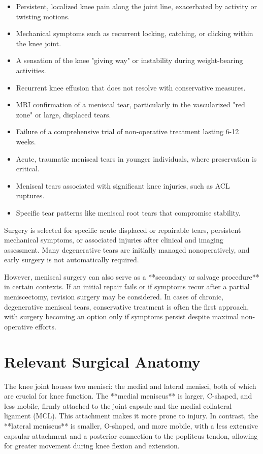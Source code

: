 \begin{itemize}
  \item Persistent, localized knee pain along the joint line, exacerbated by activity or twisting motions.
  \item Mechanical symptoms such as recurrent locking, catching, or clicking within the knee joint.
  \item A sensation of the knee "giving way" or instability during weight-bearing activities.
  \item Recurrent knee effusion that does not resolve with conservative measures.
  \item MRI confirmation of a meniscal tear, particularly in the vascularized "red zone" or large, displaced tears.
  \item Failure of a comprehensive trial of non-operative treatment lasting 6-12 weeks.
  \item Acute, traumatic meniscal tears in younger individuals, where preservation is critical.
  \item Meniscal tears associated with significant knee injuries, such as ACL ruptures.
  \item Specific tear patterns like meniscal root tears that compromise stability.
\end{itemize}

Surgery is selected for specific acute displaced or repairable tears, persistent mechanical symptoms, or associated injuries after clinical and imaging assessment. Many degenerative tears are initially managed nonoperatively, and early surgery is not automatically required.

However, meniscal surgery can also serve as a **secondary or salvage procedure** in certain contexts. If an initial repair fails or if symptoms recur after a partial meniscectomy, revision surgery may be considered. In cases of chronic, degenerative meniscal tears, conservative treatment is often the first approach, with surgery becoming an option only if symptoms persist despite maximal non-operative efforts.

\section*{Relevant Surgical Anatomy}
The knee joint houses two menisci: the medial and lateral menisci, both of which are crucial for knee function. The **medial meniscus** is larger, C-shaped, and less mobile, firmly attached to the joint capsule and the medial collateral ligament (MCL). This attachment makes it more prone to injury. In contrast, the **lateral meniscus** is smaller, O-shaped, and more mobile, with a less extensive capsular attachment and a posterior connection to the popliteus tendon, allowing for greater movement during knee flexion and extension.

